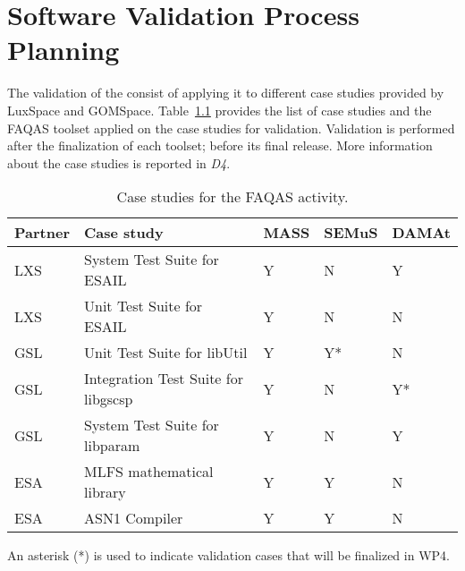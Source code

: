 
\chapter{Software Validation Process Planning}

The validation of the \FAQAS consist of applying it to different case studies provided by LuxSpace and GOMSpace.
Table~\ref{tab:caseStudies} provides the list of case studies and the FAQAS toolset applied on the case studies for validation. Validation is performed after the finalization of each toolset; before its final release. More information about the case studies is reported in \emph{D4}.

\begin{table}[htp]
\caption{Case studies for the FAQAS activity.}
\label{tab:caseStudies}
\begin{center}
\begin{tabular}{|p{1.2cm}|p{6cm}|p{1.5cm}|p{1.5cm}|p{1.5cm}|}
\hline
\textbf{Partner}&\textbf{Case study}&\textbf{MASS}&\textbf{SEMuS}&\textbf{DAMAt}\\
\hline
LXS&System Test Suite for ESAIL&Y&N&Y\\
LXS&Unit Test Suite for ESAIL&Y&N&N\\
GSL&Unit Test Suite for libUtil&Y&Y*&N\\
GSL&Integration Test Suite for libgscsp&Y&N&Y*\\
GSL&System Test Suite for libparam&Y&N&Y\\
ESA&MLFS mathematical library&Y&Y&N\\
ESA&ASN1 Compiler&Y&Y&N\\
\hline
\end{tabular}
\end{center}
An asterisk (*) is used to indicate validation cases that will be finalized in WP4.
\end{table}

\clearpage
